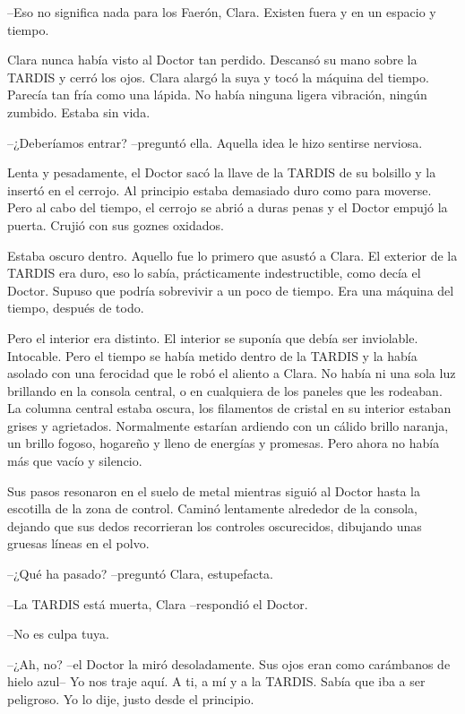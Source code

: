 {--Eso no significa nada para los Faerón, Clara. Existen fuera y en un
espacio y tiempo.}

{Clara nunca había visto al Doctor tan perdido. Descansó su mano sobre la
 TARDIS y cerró los ojos. Clara alargó la suya y tocó la máquina del
 tiempo. Parecía tan fría como una lápida. No había ninguna ligera
vibración, ningún zumbido. Estaba sin vida.}

{--¿Deberíamos entrar? --preguntó ella. Aquella idea le hizo sentirse
nerviosa.}

{Lenta y pesadamente, el Doctor sacó la llave de la TARDIS de su bolsillo
 y la insertó en el cerrojo. Al principio estaba demasiado duro como para
 moverse. Pero al cabo del tiempo, el cerrojo se abrió a duras penas y el
Doctor empujó la puerta. Crujió con sus goznes oxidados.}

{Estaba oscuro dentro. Aquello fue lo primero que asustó a Clara. El
 exterior de la TARDIS era duro, eso lo sabía, prácticamente
 indestructible, como decía el Doctor. Supuso que podría sobrevivir a un
poco de tiempo. Era una máquina del tiempo, después de todo.}

{Pero el interior era distinto. El interior se suponía que debía ser
 inviolable. Intocable. Pero el tiempo se había metido dentro de la
 TARDIS y la había asolado con una ferocidad que le robó el aliento a
 Clara. No había ni una sola luz brillando en la consola central, o en
 cualquiera de los paneles que les rodeaban. La columna central estaba
 oscura, los filamentos de cristal en su interior estaban grises y
 agrietados. Normalmente estarían ardiendo con un cálido brillo naranja,
 un brillo fogoso, hogareño y lleno de energías y promesas. Pero ahora no
había más que vacío y silencio.}

{Sus pasos resonaron en el suelo de metal mientras siguió al Doctor hasta
 la escotilla de la zona de control. Caminó lentamente alrededor de la
 consola, dejando que sus dedos recorrieran los controles oscurecidos,
dibujando unas gruesas líneas en el polvo.}

{--¿Qué ha pasado? --preguntó Clara, estupefacta.}

{--La TARDIS está muerta, Clara --respondió el Doctor.}

{--No es culpa tuya.}

{--¿Ah, no? --el Doctor la miró desoladamente. Sus ojos eran como
 carámbanos de hielo azul-- Yo nos traje aquí. A ti, a mí y a la TARDIS.\@
Sabía que iba a ser peligroso. Yo lo dije, justo desde el principio.}

